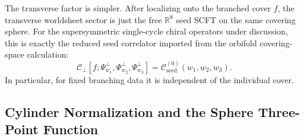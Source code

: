 \documentclass[11pt]{article}
\newcommand{\mc}[1]{\mathcal{#1}}
\newcommand{\bR}{\mathbb{R}}
\begin{document}
The transverse factor is simpler. After localizing onto the branched cover $f$, the transverse worldsheet sector is just the free $\bR^8$ seed SCFT on the same covering sphere. For the supersymmetric single-cycle chiral operators under discussion, this is exactly the reduced seed correlator imported from the orbifold covering-space calculation:
\begin{equation}\label{eq:tree-level-transverse-match}
\mc C_\perp[f;\Psi_{w_1}^\perp,\Psi_{w_2}^\perp,\Psi_{w_3}^\perp]
=
\mc C_{\mathrm{seed}}^{(0)}(w_1,w_2,w_3).
\end{equation}
In particular, for fixed branching data it is independent of the individual cover.

\subsection{Cylinder Normalization and the Sphere Three-Point Function}
\end{document}
